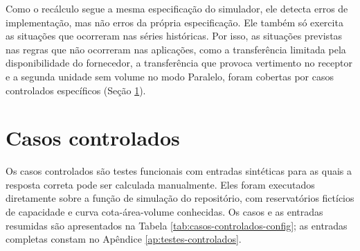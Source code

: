 Como o recálculo segue a mesma especificação do simulador, ele detecta erros de implementação, mas não erros da própria especificação. Ele também só exercita as situações que ocorreram nas séries históricas. Por isso, as situações previstas nas regras que não ocorreram nas aplicações, como a transferência limitada pela disponibilidade do fornecedor, a transferência que provoca vertimento no receptor e a segunda unidade sem volume no modo Paralelo, foram cobertas por casos controlados específicos (Seção \ref{sec:metodo-casos}).

\section{Casos controlados}
\label{sec:metodo-casos}

Os casos controlados são testes funcionais com entradas sintéticas para as quais a resposta correta pode ser calculada manualmente. Eles foram executados diretamente sobre a função de simulação do repositório, com reservatórios fictícios de capacidade e curva cota-área-volume conhecidas. Os casos e as entradas resumidas são apresentados na Tabela \ref{tab:casos-controlados-config}; as entradas completas constam no Apêndice \ref{ap:testes-controlados}.

